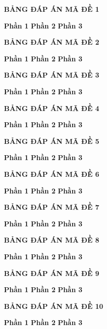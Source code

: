 \documentclass[12pt,a4paper]{article}
\begin{document}




\begin{center}
{\bf BẢNG ĐÁP ÁN MÃ ĐỀ 1 }
\end{center}
{\bf Phần 1 }
{\bf Phần 2 }
{\bf Phần 3 }
\begin{center}
{\bf BẢNG ĐÁP ÁN MÃ ĐỀ 2 }
\end{center}
{\bf Phần 1 }
{\bf Phần 2 }
{\bf Phần 3 }
\begin{center}
{\bf BẢNG ĐÁP ÁN MÃ ĐỀ 3 }
\end{center}
{\bf Phần 1 }
{\bf Phần 2 }
{\bf Phần 3 }
\begin{center}
{\bf BẢNG ĐÁP ÁN MÃ ĐỀ 4 }
\end{center}
{\bf Phần 1 }
{\bf Phần 2 }
{\bf Phần 3 }
\begin{center}
{\bf BẢNG ĐÁP ÁN MÃ ĐỀ 5 }
\end{center}
{\bf Phần 1 }
{\bf Phần 2 }
{\bf Phần 3 }
\begin{center}
{\bf BẢNG ĐÁP ÁN MÃ ĐỀ 6 }
\end{center}
{\bf Phần 1 }
{\bf Phần 2 }
{\bf Phần 3 }
\begin{center}
{\bf BẢNG ĐÁP ÁN MÃ ĐỀ 7 }
\end{center}
{\bf Phần 1 }
{\bf Phần 2 }
{\bf Phần 3 }
\begin{center}
{\bf BẢNG ĐÁP ÁN MÃ ĐỀ 8 }
\end{center}
{\bf Phần 1 }
{\bf Phần 2 }
{\bf Phần 3 }
\begin{center}
{\bf BẢNG ĐÁP ÁN MÃ ĐỀ 9 }
\end{center}
{\bf Phần 1 }
{\bf Phần 2 }
{\bf Phần 3 }
\begin{center}
{\bf BẢNG ĐÁP ÁN MÃ ĐỀ 10 }
\end{center}
{\bf Phần 1 }
{\bf Phần 2 }
{\bf Phần 3 }
\end{document}
